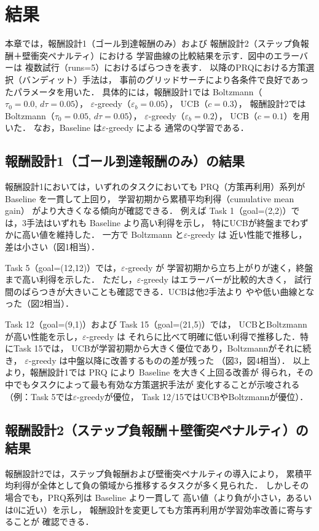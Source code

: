 \section{結果}\label{sec:results}
本章では，報酬設計1（ゴール到達報酬のみ）および
報酬設計2（ステップ負報酬＋壁衝突ペナルティ）における
学習曲線の比較結果を示す．図中のエラーバーは
複数試行（runs=5）におけるばらつきを表す．
以降のPRQにおける方策選択（バンディット）手法は，
事前のグリッドサーチにより各条件で良好であったパラメータを用いた．
具体的には，報酬設計1では 
Boltzmann（$\tau_0=0.0,\, d\tau=0.05$），
$\varepsilon$-greedy（$\varepsilon_b=0.05$），
UCB（$c=0.3$），
報酬設計2では Boltzmann（$\tau_0=0.05,\, d\tau=0.05$），
$\varepsilon$-greedy（$\varepsilon_b=0.2$），
UCB（$c=0.1$）を用いた．
なお，Baseline は$\varepsilon$-greedy による
通常のQ学習である．

\subsection{報酬設計1（ゴール到達報酬のみ）の結果}
報酬設計1においては，いずれのタスクにおいても 
PRQ（方策再利用）系列が Baseline を一貫して上回り，
学習初期から累積平均利得（cumulative mean gain）
がより大きくなる傾向が確認できる．
例えば Task 1（goal=(2,2)）では，3手法はいずれも
 Baseline より高い利得を示し，
 特にUCBが終盤までわずかに高い値を維持した．
 一方で Boltzmann と$\varepsilon$-greedy は
 近い性能で推移し，差は小さい（図1相当）．

Task 5（goal=(12,12)）では，$\varepsilon$-greedy が
学習初期から立ち上がりが速く，終盤まで高い利得を示した．
ただし，$\varepsilon$-greedy はエラーバーが比較的大きく，
試行間のばらつきが大きいことも確認できる．UCBは他2手法より
やや低い曲線となった（図2相当）．

Task 12（goal=(9,1)）および Task 15（goal=(21,5)）では，
UCBとBoltzmannが高い性能を示し，$\varepsilon$-greedy は
それらに比べて明確に低い利得で推移した．特にTask 15では，
UCBが学習初期から大きく優位であり，Boltzmannがそれに続き，
$\varepsilon$-greedy は中盤以降に改善するものの差が残った
（図3，図4相当）．
以上より，報酬設計1では PRQ により Baseline を大きく上回る改善が
得られ，その中でもタスクによって最も有効な方策選択手法が
変化することが示唆される
（例：Task 5では$\varepsilon$-greedyが優位，
Task 12/15ではUCBやBoltzmannが優位）．

\subsection{報酬設計2（ステップ負報酬＋壁衝突ペナルティ）の結果}
報酬設計2では，ステップ負報酬および壁衝突ペナルティの導入により，
累積平均利得が全体として負の領域から推移するタスクが多く見られた．
しかしその場合でも，PRQ系列は Baseline より一貫して
高い値（より負が小さい，あるいは0に近い）を示し，
報酬設計を変更しても方策再利用が学習効率改善に寄与することが
確認できる．

